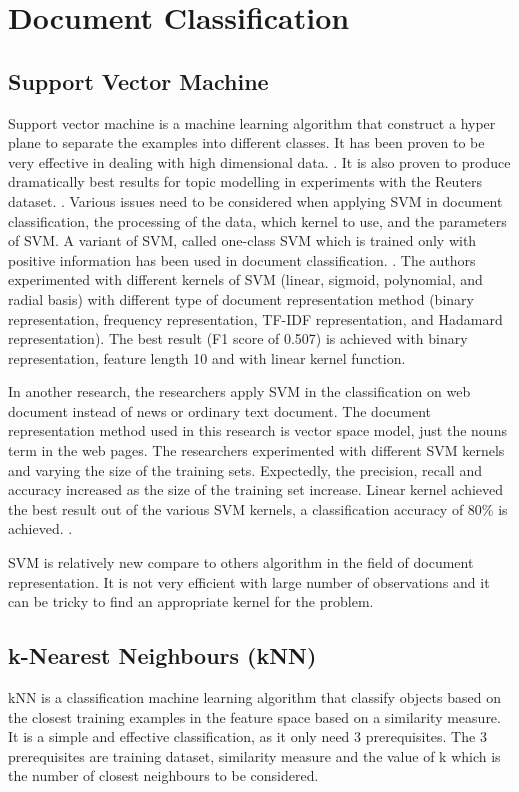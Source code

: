 \clearpage	
\section{Document Classification}
\subsection{Support Vector Machine}
Support vector machine is a machine learning algorithm that construct a hyper plane to separate the examples into different classes. It has been proven to be very effective in dealing with high dimensional data. \cite{webSvm}. It is also proven to produce dramatically best results for topic modelling in experiments with the Reuters dataset. \cite{inductiveText}. Various issues need to be considered when applying SVM in document classification, the processing of the data, which kernel to use, and the parameters of SVM. A variant of SVM, called one-class SVM which is trained only with positive information has been used in document classification. \cite{oneSvm}.  The authors experimented with different kernels of SVM (linear, sigmoid, polynomial, and radial basis) with different type of document representation method (binary representation, frequency representation, TF-IDF representation, and Hadamard representation). The best result (F1 score of 0.507) is achieved with binary representation, feature length 10 and with linear kernel function.  
	
In another research, the researchers apply SVM in the classification on web document instead of news or ordinary text document. The document representation method used in this research is vector space model, just the nouns term in the web pages. The researchers experimented with different SVM kernels and varying the size of the training sets. Expectedly, the precision, recall and accuracy increased as the size of the training set increase. Linear kernel achieved the best result out of the various SVM kernels, a classification accuracy of 80\% is achieved. \cite{webSvm}.
	
SVM is relatively new compare to others algorithm in the field of document representation. It is not very efficient with large number of observations and it can be tricky to find an appropriate kernel for the problem.


\clearpage
\subsection{k-Nearest Neighbours (kNN)}
kNN is a classification machine learning algorithm that classify objects based on the closest training examples in the feature space based on a similarity measure. It is a simple and effective classification, as it only need 3 prerequisites. The 3 prerequisites are training dataset, similarity measure and the value of k which is the number of closest neighbours to be considered. 
	
